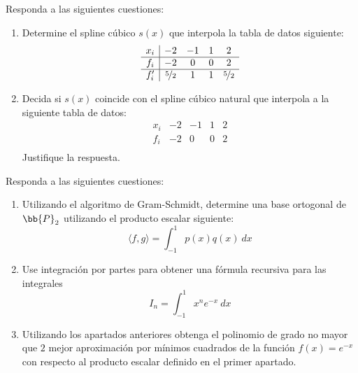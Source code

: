 \documentclass[12pt]{article}
\begin{document}
    \begin{ejercicio}
        Responda a las siguientes cuestiones:
        \begin{enumerate}
            \item Determine el spline cúbico $s(x)$ que interpola la tabla de datos siguiente:
            \begin{equation*}
                \begin{array}{c|cccc}
                    x_i & -2 & -1 & 1 & 2\\
                    \hline
                    f_i & -2 & 0 & 0 & 2\\
                    \hline
                    f_i' & \nicefrac{5}{2} & 1 & 1 & \nicefrac{5}{2}
                \end{array}
            \end{equation*}

            \item Decida si $s(x)$ coincide con el spline cúbico natural que interpola a la siguiente tabla de datos:
            \begin{equation*}
                \begin{array}{c|cccc}
                    x_i & -2 & -1 & 1 & 2\\
                    \hline
                    f_i & -2 & 0 & 0 & 2\\
                \end{array}
            \end{equation*}
            Justifique la respuesta.
        \end{enumerate}
    \end{ejercicio}


    \begin{ejercicio}
        Responda a las siguientes cuestiones:
        \begin{enumerate}
            \item Utilizando el algoritmo de Gram-Schmidt, determine una base ortogonal de $\bb{P}_2$ utilizando el producto escalar siguiente:
            \begin{equation*}
                \langle f,g\rangle=\int_{-1}^{1}p(x)q(x)~dx
            \end{equation*}

            \item Use integración por partes para obtener una fórmula recursiva para las integrales
            \begin{equation*}
                I_n = \int_{-1}^{1}x^n e^{-x}~dx
            \end{equation*}

            \item Utilizando los apartados anteriores obtenga el polinomio de grado no mayor que $2$ mejor aproximación por mínimos cuadrados de la función $f(x)=e^{-x}$
            con respecto al producto escalar definido en el primer apartado.
        \end{enumerate}
    \end{ejercicio}
\end{document}
